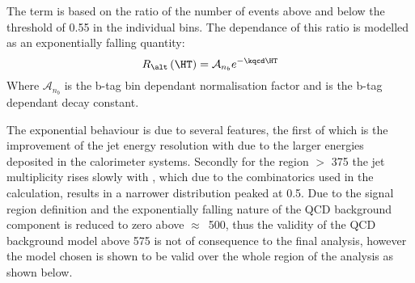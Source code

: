 The term is based on the ratio of the number of events above and below the \alt 
threshold of 0.55 in the individual \HT bins. The dependance of this ratio is 
modelled as an exponentially falling quantity:
\begin{equation}
  R_{\alt}\left(\HT\right)=\mathcal{A}_{n_{b}}e^{-\kqcd\HT}
\end{equation}
Where $\mathcal{A}_{n_{b}}$ is the b-tag bin dependant normalisation factor and 
\kqcd is the b-tag dependant decay constant.

The exponential behaviour is due to several features, the first of which is the 
improvement of the jet energy resolution with \HT due to the larger energies 
deposited in the calorimeter systems. Secondly for the region \HT $>$ 
\unit{375}{\GeV} the jet multiplicity rises slowly with \HT, which due to the 
combinatorics  used in the \alt calculation, results in a narrower \alt 
distribution peaked at 0.5. Due to the signal region definition and the 
exponentially falling nature of the QCD background component is reduced to zero 
above $\approx$~\unit{500}{\GeV}, thus the validity of the QCD background model 
above \unit{575}{\GeV} is not of consequence to the final analysis, however the 
model chosen is shown to be valid over the whole \HT region of the analysis as 
shown below.

